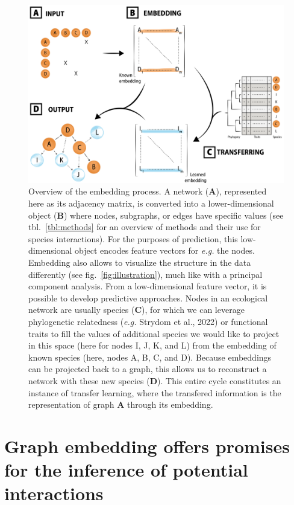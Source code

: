 \documentclass[11pt]{article}
\makeatletter
\def\maxwidth{\ifdim\Gin@nat@width>\linewidth\linewidth
\else\Gin@nat@width\fi}
\let\Oldincludegraphics\includegraphics
\renewcommand{\includegraphics}[1]{\Oldincludegraphics[width=\maxwidth]{#1}}
\makeatother
\begin{document}
\begin{figure}
\hypertarget{fig:embedding}{%
\centering
\includegraphics{figures/conceptual_2.png}
\caption{Overview of the embedding process. A network (\textbf{A}),
represented here as its adjacency matrix, is converted into a
lower-dimensional object (\textbf{B}) where nodes, subgraphs, or edges
have specific values (see tbl.~\ref{tbl:methods} for an overview of
methods and their use for species interactions). For the purposes of
prediction, this low-dimensional object encodes feature vectors for
\emph{e.g.} the nodes. Embedding also allows to visualize the structure
in the data differently (see fig.~\ref{fig:illustration}), much like
with a principal component analysis. From a low-dimensional feature
vector, it is possible to develop predictive approaches. Nodes in an
ecological network are usually species (\textbf{C}), for which we can
leverage phylogenetic relatedness (\emph{e.g.} Strydom et al., 2022) or
functional traits to fill the values of additional species we would like
to project in this space (here for nodes I, J, K, and L) from the
embedding of known species (here, nodes A, B, C, and D). Because
embeddings can be projected back to a graph, this allows us to
reconstruct a network with these new species (\textbf{D}). This entire
cycle constitutes an instance of transfer learning, where the transfered
information is the representation of graph \textbf{A} through its
embedding.}\label{fig:embedding}
}
\end{figure}

\hypertarget{graph-embedding-offers-promises-for-the-inference-of-potential-interactions}{%
\section{Graph embedding offers promises for the inference of potential
interactions}\label{graph-embedding-offers-promises-for-the-inference-of-potential-interactions}}
\end{document}
